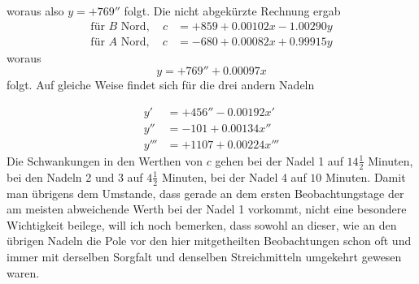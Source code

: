 woraus also $y=+769''$ folgt. Die nicht abgekürzte Rechnung ergab
\[
\begin{aligned}
\text{für }B\text{ Nord},\quad c&=+859+0.00102x-1.00290y\\
\text{für }A\text{ Nord},\quad c&=-680+0.00082x+0.99915y
\end{aligned}
\]
woraus
\[
y=+769''+0.00097x
\]
folgt. Auf gleiche Weise findet sich für die drei andern Nadeln
\par{}
\par\clearpage
{}
\[
\begin{aligned}
y'&=+456''-0.00192x'\\
y''&=-101+0.00134x''\\
y'''&=+1107+0.00224x'''
\end{aligned}
\]
Die Schwankungen in den Werthen von $c$ gehen bei der Nadel 1 auf $14\frac12$ Minuten, bei den Nadeln 2 und 3 auf $4\frac12$ Minuten, bei der Nadel 4 auf $10$ Minuten. Damit man übrigens dem Umstande, dass gerade an dem ersten Beobachtungstage der am meisten abweichende Werth bei der Nadel 1 vorkommt, nicht eine besondere Wichtigkeit beilege, will ich noch bemerken, dass sowohl an dieser, wie an den übrigen Nadeln die Pole vor den hier mitgetheilten Beobachtungen schon oft und immer mit derselben Sorgfalt und denselben Streichmitteln umgekehrt gewesen waren.


